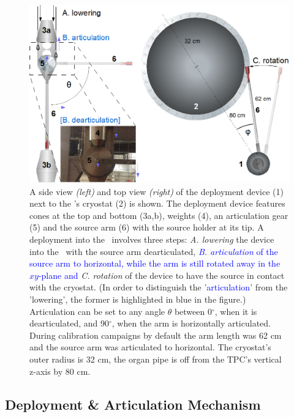 \begin{figure}[htbp]
 \centering
\includegraphics[width=\textwidth]{Figures/DeploymentDevice_XY_view2} %
  \caption{A side view \textit{(left)} and top view \textit{(right)} of the deployment device (1) next to the \tpc's cryostat (2) is shown. The deployment device features cones at the top and bottom (3a,b), weights (4), an articulation gear (5) and the source arm (6) with the source holder at its tip. A deployment into the \lsv\ involves three steps: \textit{A. lowering} the device into the \lsv\ with the source arm dearticulated, \textcolor{blue}{\textit{B. articulation} of the source arm to horizontal, while the arm is still rotated away in the $xy$-plane and} \textit{C. rotation} of the device to have the source in contact with the cryostat. (In order to distinguish the '\textcolor{blue}{articulation}' from the 'lowering', the former is highlighted in blue in the figure.) Articulation can be set to any angle $\theta$ between 0$^{\circ}$, when it is dearticulated, and 90$^{\circ}$, when the arm is horizontally articulated. During calibration campaigns by default the arm length was 62 cm and the source arm was articulated to horizontal. The cryostat's outer radius is 32 cm, the organ pipe is off from the TPC's vertical z-axis by 80 cm.\label{fig:DeploymentDevice}}
\end{figure} 


\subsection{Deployment \& Articulation Mechanism}\label{sec:DeploymentArticulation}

